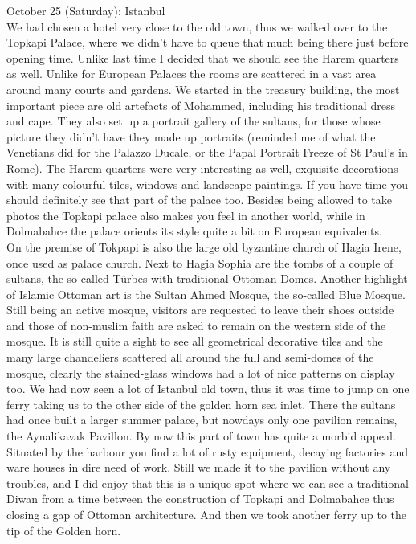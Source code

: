 October 25 (Saturday): Istanbul\\
We had chosen a hotel very close to the old town, thus we walked over to the Topkapi Palace, where we didn't have to queue that much being there just before opening time. Unlike last time I decided that we should see the Harem quarters as well. Unlike for European Palaces the rooms are scattered in a vast area around many courts and gardens. We started in the treasury building, the most important piece are old artefacts of Mohammed, including his traditional dress and cape. They also set up a portrait gallery of the sultans, for those whose picture they didn't have they made up portraits (reminded me of what the Venetians did for the Palazzo Ducale, or the Papal Portrait Freeze of St Paul's in Rome). The Harem quarters were very interesting as well, exquisite decorations with many colourful tiles, windows and landscape paintings. If you have time you should definitely see that part of the palace too. Besides being allowed to take photos the Topkapi palace also makes you feel in another world, while in Dolmabahce the palace orients its style quite a bit on European equivalents.\\
On the premise of Tokpapi is also the large old byzantine church of Hagia Irene, once used as palace church. Next to Hagia Sophia are the tombs of a couple of sultans, the so-called T\"urbes with traditional Ottoman Domes. Another highlight of Islamic Ottoman art is the Sultan Ahmed Mosque, the so-called Blue Mosque. Still being an active mosque, visitors are requested to leave their shoes outside and those of non-muslim faith are asked to remain on the western side of the mosque. It is still quite a sight to see all geometrical decorative tiles and the many large chandeliers scattered all around the full and semi-domes of the mosque, clearly the stained-glass windows had a lot of nice patterns on display too. We had now seen a lot of Istanbul old town, thus it was time to jump on one ferry taking us to the other side of the golden horn sea inlet. There the sultans had once built a larger summer palace, but nowdays only one pavilion remains, the Aynalikavak Pavillon. By now this part of town has quite a morbid appeal. Situated by the harbour you find a lot of rusty equipment, decaying factories and ware houses in dire need of work. Still we made it to the pavilion without any troubles, and I did enjoy that this is a unique spot where we can see a traditional Diwan from a time between the construction of Topkapi and Dolmabahce thus closing a gap of Ottoman architecture. And then we took another ferry up to the tip of the Golden horn.\\
